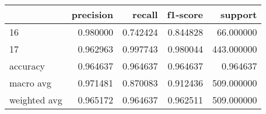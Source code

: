 \begin{tabular}{lrrrr}
\toprule
 & precision & recall & f1-score & support \\
\midrule
16 & 0.980000 & 0.742424 & 0.844828 & 66.000000 \\
17 & 0.962963 & 0.997743 & 0.980044 & 443.000000 \\
accuracy & 0.964637 & 0.964637 & 0.964637 & 0.964637 \\
macro avg & 0.971481 & 0.870083 & 0.912436 & 509.000000 \\
weighted avg & 0.965172 & 0.964637 & 0.962511 & 509.000000 \\
\bottomrule
\end{tabular}
